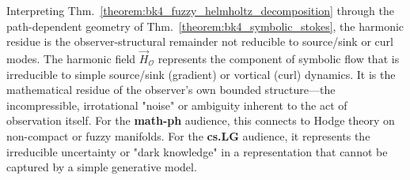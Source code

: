 \begin{scholium}
\label{scholium:bk4_dark_knowledge}
Interpreting Thm.~\ref{theorem:bk4_fuzzy_helmholtz_decomposition} through the path-dependent geometry of Thm.~\ref{theorem:bk4_symbolic_stokes}, the harmonic residue is the observer-structural remainder not reducible to source/sink or curl modes.
The harmonic field $\vec{H}_{\mathcal{O}}$ represents the component of symbolic flow that is irreducible to simple source/sink (gradient) or vortical (curl) dynamics. It is the mathematical residue of the observer's own bounded structure---the incompressible, irrotational "noise" or ambiguity inherent to the act of observation itself. For the \textbf{math-ph} audience, this connects to Hodge theory on non-compact or fuzzy manifolds. For the \textbf{cs.LG} audience, it represents the irreducible uncertainty or "dark knowledge" in a representation that cannot be captured by a simple generative model.
\end{scholium}
